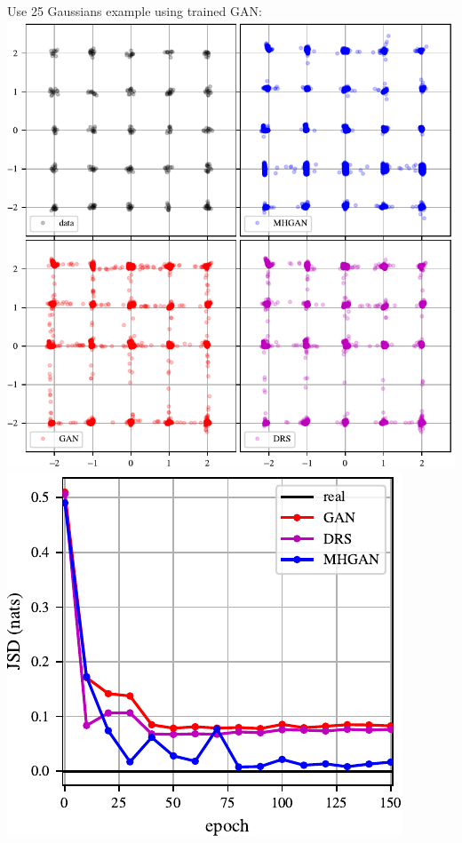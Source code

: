 \documentclass[a0,landscape]{a0poster}
\begin{document}
\begin{multicols}{3}
Use 25 Gaussians example using trained GAN:\\
\includegraphics[scale=1.0]{../figures/mog_example_150.pdf}
\includegraphics[scale=2.0]{../figures/jsd.pdf}


\end{multicols}
\end{document}
